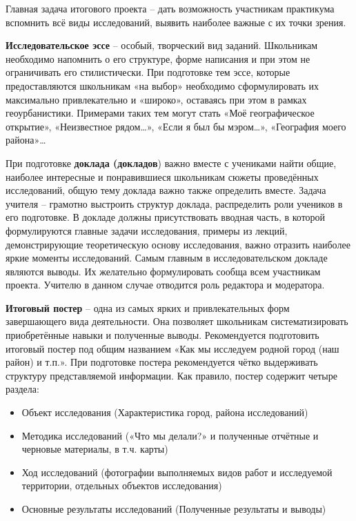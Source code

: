 \documentclass[
  11pt,
  russian,
]{book}
\begin{document}
Главная задача итогового проекта -- дать возможность участникам практикума вспомнить всё виды
исследований, выявить наиболее важные с их точки зрения.

\textbf{Исследовательское эссе} -- особый, творческий вид заданий. Школьникам необходимо напомнить о его структуре, форме написания и
при этом не ограничивать его стилистически. При подготовке тем эссе, которые предоставляются школьникам «на выбор» необходимо сформулировать их максимально привлекательно и «широко», оставаясь при этом в рамках геоурбанистики.
Примерами таких тем могут стать «Моё географическое открытие», «Неизвестное рядом\ldots», «Если я был бы мэром\ldots», «География моего района»\ldots{}

При подготовке \textbf{доклада (докладов}) важно вместе с учениками найти общие, наиболее интересные и понравившиеся школьникам
сюжеты проведённых исследований, общую тему доклада важно также определить вместе. Задача учителя -- грамотно выстроить структур доклада, распределить роли учеников в его подготовке. В докладе должны присутствовать вводная часть, в которой формулируются главные задачи исследования, примеры из лекций, демонстрирующие теоретическую основу исследования, важно отразить наиболее
яркие моменты исследований. Самым главным в исследовательском докладе являются выводы. Их желательно формулировать сообща всем участникам проекта. Учителю в данном случае отводится роль редактора и модератора.

\textbf{Итоговый постер} -- одна из самых ярких и привлекательных форм завершающего вида деятельности. Она позволяет школьникам
систематизировать приобретённые навыки и полученные выводы. Рекомендуется подготовить итоговый постер под общим названием «Как мы исследуем родной город (наш район) и т.п.». При подготовке постера рекомендуется чётко выдерживать структуру представляемой информации. Как правило, постер содержит четыре раздела:

\begin{itemize}
\item
  Объект исследования (Характеристика город, района исследований)
\item
  Методика исследований («Что мы делали?» и полученные отчётные и черновые материалы, в т.ч. карты)
\item
  Ход исследований (фотографии выполняемых видов работ и исследуемой территории, отдельных объектов исследования)
\item
  Основные результаты исследований (Полученные результаты и выводы)
\end{itemize}
\end{document}
